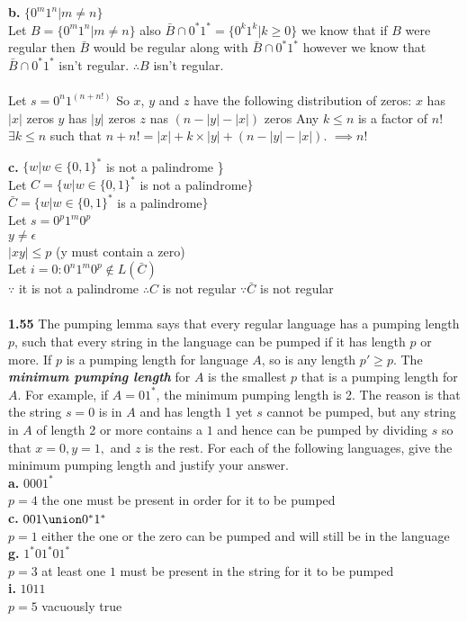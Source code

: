 \documentclass{article}
\begin{document}
{\bf b.} $\{0^{m}1^{n} | m \neq n\}$\\
\subitem Let $B = \{0^m1^n | m \neq n\}$
\subitem also $\bar{B}\cap0^*1^* = \{0^k1^k | k \geq 0\}$
\subitem we know that if $B$ were regular then $\bar{B}$ would be regular along with $\bar{B}\cap0^*1^*$
\subitem however we know that $\bar{B}\cap0^*1^*$ isn't regular.
\subitem $\therefore B$ isn't regular.
\\
\\
\subitem Let $s = 0^n1^{(n+n!)}$
\subitem So $x$, $y$ and $z$ have the following distribution of zeros:
	\subsubitem $x$ has $|x|$ zeros
	\subsubitem $y$ has $|y|$ zeros
	\subsubitem $z$ nas $(n - |y| - |x|)$ zeros
\subitem Any $k \le n$ is a factor of $n!$
\subitem $\exists k \le n$ such that $n + n! = |x| + k \times |y| + (n - |y| - |x|)$.
\subitem $\implies n! $



{\bf c.} $\{w | w \in \{0,1\}^{*} $ is not a palindrome \} \\
\subitem
Let $C = \{w | w \in \{0,1\}^{*} $ is not a palindrome$ \}$\\
$\bar{C} = \{w | w \in \{0,1\}^{*} $ is a palindrome$ \}$\\
Let $s = 0^{p}1^{m}0^{p}$\\
$y \neq \epsilon$\\
$|xy| \leq p$ (y must contain a zero)\\
Let $i = 0 : 0^{n}1^{m}0^{p} \notin L(\bar{C})$\\
$\because$ it is not a palindrome
$\therefore C$ is not regular
$\because \bar{C}$ is not regular\\
\\

{\bf 1.55} The pumping lemma says that every regular language has a pumping length $p$, such that every string in the language can be pumped if it has length $p$ or more. If $p$ is a pumping length for language $A$, so is any length $p' \geq p$. The {\bf {\em minimum pumping length}} for $A$ is the smallest $p$ that is a pumping length for $A$. For example, if $A = 01^{*}$, the minimum pumping length is 2. The reason is that the string $s=0$ is in $A$ and has length 1 yet $s$ cannot be pumped, but any string in $A$ of length 2 or more contains a $1$ and hence can be pumped by dividing $s$ so that $x=0, y = 1,$ and $z$ is the rest. For each of the following languages, give the minimum pumping length and justify your answer.
\\{\bf a.} $0001^{*}$
\\$p=4$ the one must be present in order for it to be pumped
\\{\bf c.} $001 \union 0^{*}1^{*}$
\\$p=1$ either the one or the zero can be pumped and will still be in the language
\\{\bf g.} $1^{*}01^{*}01^{*}$
\\$p=3$ at least one $1$ must be present in the string for it to be pumped
\\{\bf i.} $1011$
\\$p=5$ vacuously true
\end{document}
